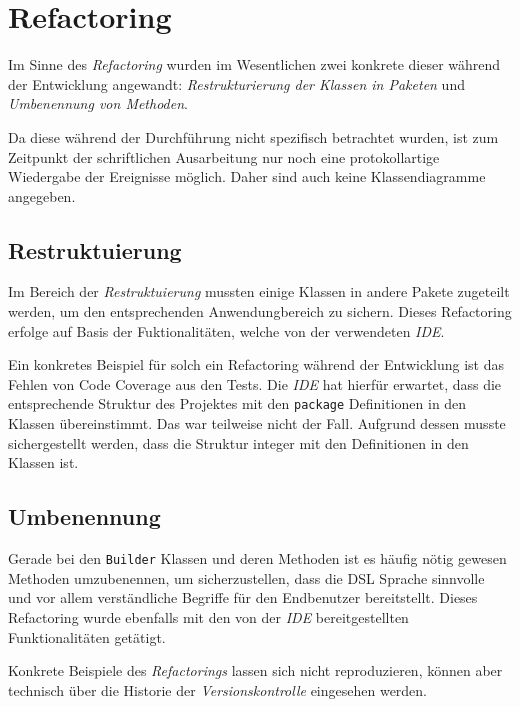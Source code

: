 \section{Refactoring}
\label{sec:refactoring}

Im Sinne des \emph{Refactoring} wurden im Wesentlichen zwei konkrete dieser während der Entwicklung angewandt: \emph{Restrukturierung der Klassen in Paketen} und \emph{Umbenennung von Methoden}.

Da diese während der Durchführung nicht spezifisch betrachtet wurden, ist zum Zeitpunkt der schriftlichen Ausarbeitung nur noch eine protokollartige Wiedergabe der Ereignisse möglich.
Daher sind auch keine Klassendiagramme angegeben.

\subsection{Restruktuierung}
\label{subsec:restrukturierung}

Im Bereich der \emph{Restruktuierung} mussten einige Klassen in andere Pakete zugeteilt werden, um den entsprechenden Anwendungbereich zu sichern.
Dieses Refactoring erfolge auf Basis der Fuktionalitäten, welche von der verwendeten \emph{IDE}.

Ein konkretes Beispiel für solch ein Refactoring während der Entwicklung ist das Fehlen von Code Coverage aus den Tests.
Die \emph{IDE} hat hierfür erwartet, dass die entsprechende Struktur des Projektes mit den \texttt{package} Definitionen in den Klassen übereinstimmt.
Das war teilweise nicht der Fall.
Aufgrund dessen musste sichergestellt werden, dass die Struktur integer mit den Definitionen in den Klassen ist.

\subsection{Umbenennung}
\label{subsec:umbenennung}

Gerade bei den \texttt{Builder} Klassen und deren Methoden ist es häufig nötig gewesen Methoden umzubenennen, um sicherzustellen, dass die DSL Sprache sinnvolle und vor allem verständliche Begriffe für den Endbenutzer bereitstellt.
Dieses Refactoring wurde ebenfalls mit den von der \emph{IDE} bereitgestellten Funktionalitäten getätigt.

Konkrete Beispiele des \emph{Refactorings} lassen sich nicht reproduzieren, können aber technisch über die Historie der \emph{Versionskontrolle} eingesehen werden.
